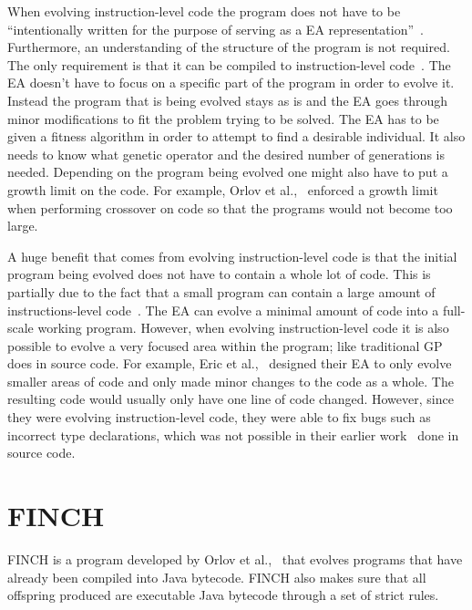 \documentclass{sig-alternate}
\begin{document}
When evolving instruction-level code the program does not have to be ``intentionally written for the purpose of serving as a EA representation''~\cite{FINCH2:2009}. Furthermore, an understanding of the structure of the program is not required. The only requirement is that it can be compiled to instruction-level code~\cite{FINCH2:2009, Assembly:2010}. The EA doesn't have to focus on a specific part of the program in order to evolve it. Instead the program that is being evolved stays as is and the EA goes through minor modifications to fit the problem trying to be solved. The EA has to be given a fitness algorithm in order to attempt to find a desirable individual. It also needs to know what genetic operator and the desired number of generations is needed. Depending on the program being evolved one might also have to put a growth limit on the code. For example, Orlov et al.,~\cite{FINCH:2011} enforced a growth limit when performing crossover on code so that the programs would not become too large.

A huge benefit that comes from evolving instruction-level code is that the initial program being evolved does not have to contain a whole lot of code. This is partially due to the fact that a small program can contain a large amount of instructions-level code~\cite{Assembly:2010}. The EA can evolve a minimal amount of code into a full-scale working program. However, when evolving instruction-level code it is also possible to evolve a very focused area within the program; like traditional GP does in source code. For example, Eric et al.,~\cite{Assembly:2010} designed their EA to only evolve smaller areas of code and only made minor changes to the code as a whole. The resulting code would usually only have one line of code changed. However, since they were evolving instruction-level code, they were able to fix bugs such as incorrect type declarations, which was not possible in their earlier work~\cite{Forrest:2009} done in source code. 

\section{FINCH}
FINCH is a program developed by Orlov et al.,~\cite{FINCH2:2009,FINCH:2011} that evolves programs that have already been compiled into Java bytecode. FINCH also makes sure that all offspring produced are executable Java bytecode through a set of strict rules. 
\end{document}
